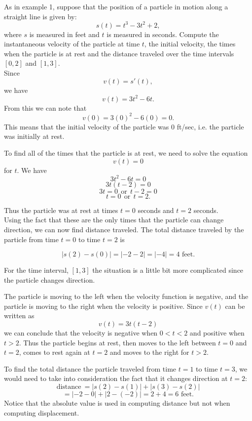 \documentclass{ximera}
\begin{document}
 
\begin{example}[example 2] As in example 1, suppose that the position of a particle in motion along a 
straight line is given by:
\[s(t) = t^3 - 3t^2 + 2,\]
where $s$ is measured in feet and $t$ is measured in seconds.
Compute the instantaneous velocity of the particle at time $t$, the initial velocity, the times when the particle 
is at rest and the distance traveled over the time intervals $[0,2]$ and $[1,3]$.\\


Since 
\[v(t) = s'(t),\]
we have
\[v(t) = 3t^2 - 6t.\]
From this we can note that
\[v(0) = 3(0)^2 - 6(0) = 0.\]
This means that the initial velocity of the particle was 0 ft/sec, i.e. the particle was initially at rest.  

To find all of the times that the particle is at rest, we need to solve the equation
\[v(t) = 0\]
for $t$.  
We have
\[3t^2 - 6t = 0\]
\[3t(t-2) = 0\]
\[3t = 0 \ \ \text{or} \ \ t-2 = 0\]
\[t = 0 \ \ \text{or} \ \ t = 2.\]

Thus the particle was at rest at times $t = 0$ seconds and $t = 2$ seconds.\\

Using the fact that these are the only times that the particle can change direction, we can now find distance traveled.
The total distance traveled by the particle from time $t=0$ to time $t=2$ is 

\[|s(2) - s(0)| = |-2 - 2| = |-4| = 4 \text{ feet.}\]

For the time interval, $[1,3]$ the situation is a little bit more complicated since the particle changes direction.

The particle is moving to the left when the velocity function is negative, and the particle is moving to the right when the 
velocity is positive. Since $v(t)$ can be written as
\[v(t) = 3t(t-2)\]
we can conclude that the velocity is negative when $0<t<2$ and positive when $t>2$.
Thus the particle begins at rest, then moves to the left between $t = 0$ and $t = 2$, comes to rest again at $t=2$
and moves to the right for $t>2$.

To find the total distance the particle traveled from time $t = 1$ to time $t = 3$, we would need to take into consideration
the fact that it changes direction at $t = 2$:
\[ \text{distance} \  = |s(2) - s(1)| + |s(3) -s(2)|\]
\[= |-2-0|+|2-(-2)| = 2 + 4 = 6  \text{ feet}.\]
Notice that the absolute value is used in computing distance but not when computing displacement.





\end{example}
\end{document}
